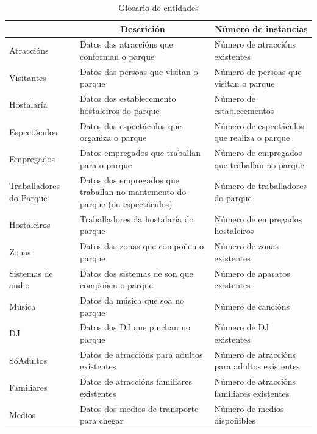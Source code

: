 \documentclass[12pt,a4paper]{book}
\theoremstyle{definition}
\theoremstyle{break}
\begin{document}
	\begin{table} [H] \centering
		\caption{Glosario de entidades\\}
		\begin{tabular}{|m{2.5cm}|m{5.5cm}|m{5.5cm}|}
			\hline \rowcolor{gris}
			\multicolumn{1}{|c|}{Entidades} & \multicolumn{1}{c|}{Descrición} & \multicolumn{1}{c|}{Número de instancias} \\
			\hline
			Atraccións & Datos das atraccións que conforman o parque & Número de atraccións existentes \\
			\hline
			Visitantes & Datos das persoas que visitan o parque & Número de persoas que visitan o parque \\
			\hline
			Hostalaría & Datos dos establecemento hostaleiros do parque & Número de establecementos \\
			\hline
			Espectáculos & Datos dos espectáculos que organiza o parque & Número de espectáculos que realiza o parque \\
			\hline
			Empregados & Datos empregados que traballan para o parque & Número de empregados que traballan no parque \\
			\hline
			Traballadores do Parque & Datos dos empregados que traballan no mantemento do parque (ou espectáculos) & Número de traballadores do parque \\
			\hline
			Hostaleiros & Traballadores da hostalaría do parque & Número de empregados hostaleiros  \\
			\hline
			Zonas & Datos das zonas que  compoñen o parque & Número de zonas existentes\\
			\hline
			Sistemas de audio &  Datos dos sistemas de son que compoñen o parque & Número de aparatos existentes\\
			\hline
			Música &  Datos da música que soa no parque & Número de cancións\\
			\hline
			DJ &  Datos dos DJ que pinchan no parque & Número de DJ existentes\\
			\hline
			SóAdultos & Datos de atraccións para adultos existentes & Número de atraccións para adultos existentes \\
			\hline
			Familiares & Datos de atraccións familiares existentes & Número de atraccións  familiares existentes \\
			\hline
			Medios & Datos dos medios de transporte para chegar & Número de medios  dispoñibles \\
			\hline
		\end{tabular}
	\end{table}
	
\end{document}
